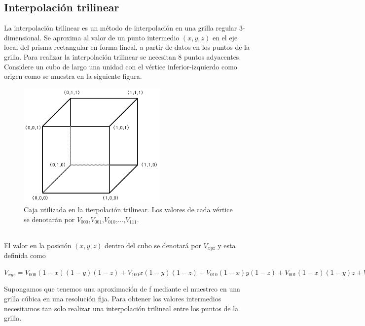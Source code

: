 \documentclass[12pt]{article}
\begin{document}
\subsection{Interpolación trilinear}
La interpolación trilinear\cite{inter} es un método de interpolación en una grilla regular 3-dimensional. Se aproxima al valor de un punto intermedio $(x, y, z)$ en el eje local del prisma rectangular en forma lineal, a partir de datos en los puntos de la grilla. Para realizar la interpolación trilinear se necesitan 8 puntos adyacentes.
Considere un cubo de largo una unidad con el vértice inferior-izquierdo como origen como se muestra en la siguiente figura.
\begin{figure}[h!]
\includegraphics[width=0.65\textwidth,center]{inter.png}
\caption{Caja utilizada en la iterpolación trilinear. Los valores de cada vértice se denotarán por $V_{000}$,$V_{001}$,$V_{010}$,...,$V_{111}$.}
\end{figure}
\\El valor en la posición $(x,y,z)$ dentro del cubo se denotará por $V_{xyz}$ y esta definida como
\begin{center}
$V_{xyz}=V_{000}(1-x)(1-y)(1-z) + V_{100}x(1-y)(1-z) + V_{010}(1-x)y(1-z) + V_{001}(1-x)(1-y)z + V_{101}x(1-y)z + V_{011}(1-x)yz + V_{110}xy(1-z) + V_{111}xyz$
\end{center}
Supongamos que tenemos una aproximación de f mediante el muestreo en una grilla cúbica en una resolución fija. Para obtener los valores intermedios necesitamos tan solo realizar una interpolación trilineal entre los puntos de la grilla.
\end{document}
